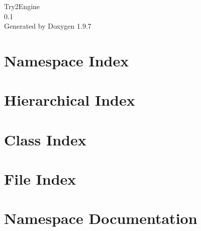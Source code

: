 \documentclass[twoside]{book}
\newcommand{\+}{\discretionary{\mbox{\scriptsize$\hookleftarrow$}}{}{}}
\newcommand{\clearemptydoublepage}{%
    \newpage{\pagestyle{empty}\cleardoublepage}%
  }
\begin{document}
  \raggedbottom
    \hypersetup{pageanchor=false,
                bookmarksnumbered=true,
                pdfencoding=unicode
               }
  \begin{titlepage}
  \vspace*{7cm}
  \begin{center}%
  {\Large Try2\+Engine}\\
  [1ex]\large 0.\+1 \\
  \vspace*{1cm}
  {\large Generated by Doxygen 1.9.7}\\
  \end{center}
  \end{titlepage}
  \clearemptydoublepage
  \tableofcontents
  \clearemptydoublepage
  \hypersetup{pageanchor=true}

\chapter{Namespace Index}

\chapter{Hierarchical Index}

\chapter{Class Index}

\chapter{File Index}

\chapter{Namespace Documentation}














\end{document}
